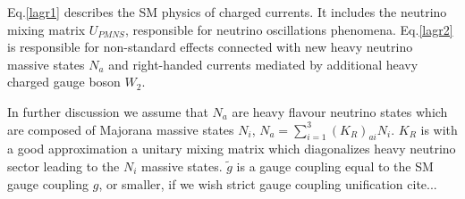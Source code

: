 \documentclass[twocolumn,superscriptaddress,showpacs,prl,nofootinbib,floatfix]{revtex4}
\begin{document}
Eq.\ref{lagr1} describes the SM physics of charged currents. It includes the neutrino mixing matrix 
$U_{PMNS}$, responsible for neutrino oscillations phenomena. Eq.\ref{lagr2} is responsible for non-standard effects connected with new heavy neutrino massive states $N_a$ and right-handed currents mediated by additional heavy charged gauge boson $W_2$. 


In further discussion we assume that $N_a$ are heavy flavour neutrino states which are composed of Majorana massive states $N_i$, $N_a = \sum\limits_{i=1}^3 {(K_R)}_{ai} N_i$. 
$K_R$ is with a good approximation a unitary mixing matrix which diagonalizes heavy neutrino sector leading to the $N_i$ massive states. 
$\tilde{g}$ is a gauge coupling equal to the SM gauge coupling $g$, or smaller, if we wish  strict gauge coupling unification cite...

 
\end{document}
